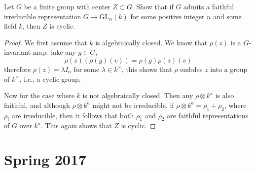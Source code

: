 \documentclass[openany]{book}
\begin{document}
\begin{prob}
    Let \(G\) be a finite group with center \(Z\subset G\). Show that if \(G\) admits a faithful irreducible representation \(G\to\text{GL}_{n}(k)\) for some positive integer \(n\) and some field \(k\), then \(Z\) is cyclic.
\end{prob}
\begin{proof}
    We first assume that $k$ is algebraically closed. We know that $\rho(z)$ is a $G$-invariant map: take any $g\in G$,
    \begin{equation*}
        \rho(z)(\rho(g)(v))=\rho(g)\rho(z)(v)
    \end{equation*}
    therefore $\rho(z)=\lambda I_n$ for some $\lambda\in k^\times$, this shows that $\rho$ embdes $z$ into a group of $k^\times$, i.e., a cyclic group.

    Now for the case where $k$ is not algebraically closed. Then any $\rho\otimes k^a$ is also faithful, and although $\rho\otimes k^a$ might not be irreducible, if $\rho\otimes k^a=\rho_1+\rho_2$, where $\rho_i$ are irreducible, then it follows that both $\rho_1$ and $\rho_2$ are faithful representations of $G$ over $k^a$. This again shows that $Z$ is cyclic.
\end{proof}







\chapter{Spring 2017}
\end{document}
